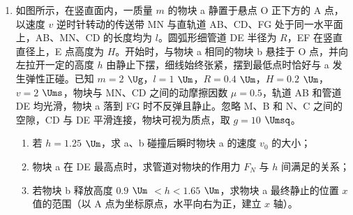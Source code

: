 \documentclass[\gkver]{gaokaozhenti}
\begin{document}
\begin{enumerate}
{	根据运动学公式

	$-2a_{2}l_{2}=v_{\max}^{2}-v^{2}$

	代入数据联立解得

	$l_{2}=2.7$ $\Um$
}

\item
如图所示，在竖直面内，一质量 $m$ 的物块 a 静置于悬点 O 正下方的 A 点，以速度 $v$ 逆时针转动的传送带 MN 与直轨道 AB、CD、FG 处于同一水平面上，AB、MN、CD 的长度均为 $l$。圆弧形细管道 DE 半径为 $R$，EF 在竖直直径上，E 点高度为 $H$。开始时，与物块 a 相同的物块 b 悬挂于 O 点，并向左拉开一定的高度 $h$ 由静止下摆，细线始终张紧，摆到最低点时恰好与 a 发生弹性正碰。已知 $m = 2$ $\Ug$，$l = 1$ $\Um$，$R = 0.4$ $\Um$，$H = 0.2$ $\Um$，$v = 2$ $\Ums$，物块与 MN、CD 之间的动摩擦因数 $\mu = 0.5$，轨道 AB 和管道 DE 均光滑，物块 a 落到 FG 时不反弹且静止。忽略 M、B 和 N、C 之间的空隙，CD 与 DE 平滑连接，物块可视为质点，取 $g = 10$ $\Umsq$。
\begin{enumerate}
	\item
	若 $h = 1.25$ $\Um$，求 a、b 碰撞后瞬时物块 a 的速度 $v_{0}$ 的大小；
	\item
	物块 a 在 DE 最高点时，求管道对物块的作用力 $F_{N}$ 与 $h$ 间满足的关系；
	\item
	若物块 b 释放高度 $0.9$ $\Um$ $< h < 1.65$ $\Um$，求物块 a 最终静止的位置 $x$ 值的范围（以 A 点为坐标原点，水平向右为正，建立 $x$ 轴）。
\end{enumerate}

\end{enumerate}
\end{document}
